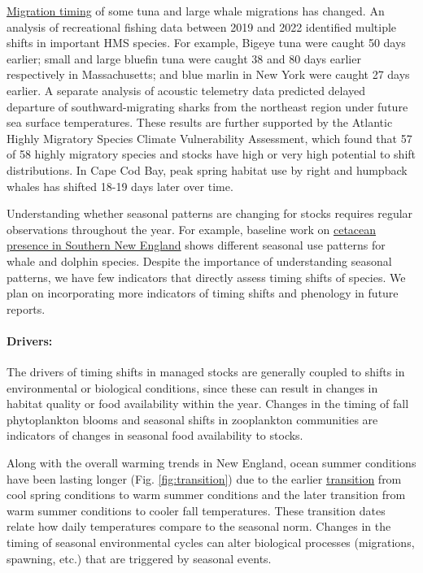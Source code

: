 \documentclass[
  10pt,
]{article}
\begin{document}
\href{https://noaa-edab.github.io/catalog/timing_shifts.html}{Migration timing} of some tuna and large whale migrations has changed. An analysis of recreational fishing data between 2019 and 2022 identified multiple shifts in important HMS species. For example, Bigeye tuna were caught 50 days earlier; small and large bluefin tuna were caught 38 and 80 days earlier respectively in Massachusetts; and blue marlin in New York were caught 27 days earlier. A separate analysis of acoustic telemetry data predicted delayed departure of southward-migrating sharks from the northeast region under future sea surface temperatures. These results are further supported by the Atlantic Highly Migratory Species Climate Vulnerability Assessment, which found that 57 of 58 highly migratory species and stocks have high or very high potential to shift distributions. In Cape Cod Bay, peak spring habitat use by right and humpback whales has shifted 18-19 days later over time.

Understanding whether seasonal patterns are changing for stocks requires regular observations throughout the year. For example, baseline work on \href{https://noaa-edab.github.io/catalog/cetacean_acoustic.html}{cetacean presence in Southern New England} shows different seasonal use patterns for whale and dolphin species. Despite the importance of understanding seasonal patterns, we have few indicators that directly assess timing shifts of species. We plan on incorporating more indicators of timing shifts and phenology in future reports.

\paragraph{Drivers:}\label{drivers-1}

The drivers of timing shifts in managed stocks are generally coupled to shifts in environmental or biological conditions, since these can result in changes in habitat quality or food availability within the year. Changes in the timing of fall phytoplankton blooms and seasonal shifts in zooplankton communities are indicators of changes in seasonal food availability to stocks.

Along with the overall warming trends in New England, ocean summer conditions have been lasting longer (Fig. \ref{fig:transition}) due to the earlier \href{https://noaa-edab.github.io/catalog/trans_dates.html}{transition} from cool spring conditions to warm summer conditions and the later transition from warm summer conditions to cooler fall temperatures. These transition dates relate how daily temperatures compare to the seasonal norm. Changes in the timing of seasonal environmental cycles can alter biological processes (migrations, spawning, etc.) that are triggered by seasonal events.
\end{document}
